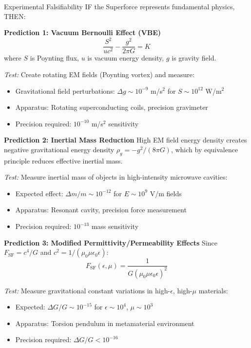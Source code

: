 \begin{frameworkclaim}{Experimental Falsifiability}
IF the Superforce represents fundamental physics, THEN:

\textbf{Prediction 1: Vacuum Bernoulli Effect (VBE)}
\begin{equation}
\frac{S^2}{uc^2} - \frac{g^2}{2\pi G} = K
\end{equation}
where $S$ is Poynting flux, $u$ is vacuum energy density, $g$ is gravity field.

\textit{Test:} Create rotating EM fields (Poynting vortex) and measure:
\begin{itemize}
\item Gravitational field perturbations: $\Delta g \sim 10^{-9}$ m/s$^2$ for $S \sim 10^{12}$ W/m$^2$
\item Apparatus: Rotating superconducting coils, precision gravimeter
\item Precision required: $10^{-10}$ m/s$^2$ sensitivity
\end{itemize}

\textbf{Prediction 2: Inertial Mass Reduction}
High EM field energy density creates negative gravitational energy density $\rho_g = -g^2/(8\pi G)$, which by equivalence principle reduces effective inertial mass.

\textit{Test:} Measure inertial mass of objects in high-intensity microwave cavities:
\begin{itemize}
\item Expected effect: $\Delta m/m \sim 10^{-12}$ for $E \sim 10^9$ V/m fields
\item Apparatus: Resonant cavity, precision force measurement
\item Precision required: $10^{-13}$ mass sensitivity
\end{itemize}

\textbf{Prediction 3: Modified Permittivity/Permeability Effects}
Since $F_{\text{SF}} = c^4/G$ and $c^2 = 1/(\mu_0\mu\epsilon_0\epsilon)$:
\begin{equation}
F_{\text{SF}}(\epsilon,\mu) = \frac{1}{G(\mu_0\mu\epsilon_0\epsilon)^2}
\end{equation}

\textit{Test:} Measure gravitational constant variations in high-$\epsilon$, high-$\mu$ materials:
\begin{itemize}
\item Expected: $\Delta G/G \sim 10^{-15}$ for $\epsilon \sim 10^4$, $\mu \sim 10^3$
\item Apparatus: Torsion pendulum in metamaterial environment
\item Precision required: $\Delta G/G < 10^{-16}$
\end{itemize}
\end{frameworkclaim}

